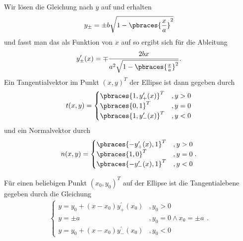 \begin{solution}

Wir lösen die Gleichung nach $y$ auf und erhalten
\begin{align*}
  y_{\pm} = \pm b \sqrt{1 - \pbraces{ \frac{x}{a} }^2} 
\end{align*}
und fasst man das als Funktion von $x$ auf so ergibt sich für die Ableitung
\begin{align*}
  y^\prime_{\pm}(x) = \mp \frac{2bx}{a^2 \sqrt{1 - \pbraces{ \frac{x}{a} }^2} }.
\end{align*}
Ein Tangentialvektor im Punkt $(x,y)^T$ der Ellipse ist dann gegeben durch
\begin{align*}
  t(x,y) =
  \begin{cases}
    \pbraces{1, y_+^\prime(x)}^T & ,y > 0 \\
    \pbraces{0, 1}^T & ,y = 0 \\
    \pbraces{1, y_-^\prime(x)}^T & ,y < 0
  \end{cases}
\end{align*}
und ein Normalvektor durch
\begin{align*}
  n(x,y) =
  \begin{cases}
    \pbraces{ -y_+^\prime(x), 1}^T & ,y > 0 \\
    \pbraces{1, 0}^T & ,y = 0 \\
    \pbraces{ -y_-^\prime(x), 1}^T & ,y < 0
  \end{cases} .
\end{align*}

Für einen beliebigen Punkt $(x_0, y_0)^T$ auf der Ellipse ist die Tangentialebene gegeben durch die Gleichung 
\begin{align*}
  \begin{cases}
    y = y_0 + (x - x_0)y_+^\prime(x_0) & ,y_0 > 0 \\
    y = \pm a & ,y_0 = 0 \land x_0 = \pm a \\
    y = y_0 + (x - x_0) y_-^\prime(x_0) & ,y_0 < 0
  \end{cases}.
\end{align*}


\end{solution}
